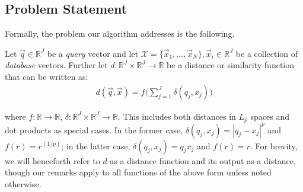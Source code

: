 





\subsection{Problem Statement}

Formally, the problem our algorithm addresses is the following.

Let $\vec{q} \in \mathbb{R}^J$ be a \textit{query} vector and let $\mathcal{X} = \{\vec{x}_1,\ldots,\vec{x}_N\}, \vec{x}_i \in \mathbb{R}^J$ be a collection of \textit{database} vectors. Further let $d: \mathbb{R}^J \times \mathbb{R}^J \rightarrow \mathbb{R}$ be a distance or similarity function that can be written as:
\begin{align} \label{eq:distFuncForm}
        d(\vec{q}, \vec{x}) = f \big( \sum_{j=1}^J \delta(q_j, x_j) \big)
\end{align}


where $f: \mathbb{R} \rightarrow \mathbb{R}$, $\delta: \mathbb{R}^J \times \mathbb{R}^J \rightarrow \mathbb{R}$. This includes both distances in $L_p$ spaces and dot products as special cases. In the former case, $\delta(q_j, x_j) = |q_j - x_j|^p$ and $f(r) = r^{(1/p)}$; in the latter case, $\delta(q_j, x_j) = q_j x_j$ and $f(r) = r$. For brevity, we will henceforth refer to $d$ as a distance function and its output as a distance, though our remarks apply to all functions of the above form unless noted otherwise.

